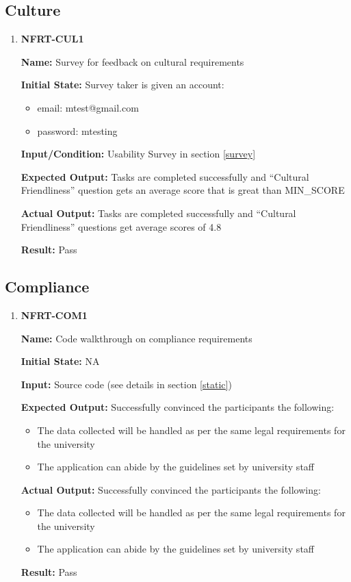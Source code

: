 \documentclass[12pt, titlepage]{article}
\begin{document}
\subsection{Culture}
\begin{enumerate}
\item \textbf{NFRT-CUL1}

\textbf{Name:} Survey for feedback on cultural requirements

\textbf{Initial State:} Survey taker is given an account:
\begin{itemize}
\item email: mtest@gmail.com
\item password: mtesting
\end{itemize}

\textbf{Input/Condition:} Usability Survey in section \ref{survey}

\textbf{Expected Output:} Tasks are completed successfully and ``Cultural Friendliness'' question gets an average score that is great than MIN\_SCORE

\textbf{Actual Output:} Tasks are completed successfully and ``Cultural Friendliness'' questions get average scores of 4.8

\textbf{Result:} Pass
\end{enumerate}
\subsection{Compliance}
\begin{enumerate}
\item \textbf{NFRT-COM1}

\textbf{Name:} Code walkthrough on compliance requirements

\textbf{Initial State:} NA

\textbf{Input:} Source code (see details in section \ref{static})

\textbf{Expected Output:} Successfully convinced the participants the following:
\begin{itemize}
\item The data collected will be handled as per the same legal requirements for the university
\item The application can abide by the guidelines set by university staff
\end{itemize}

\textbf{Actual Output:} Successfully convinced the participants the following:
\begin{itemize}
\item The data collected will be handled as per the same legal requirements for the university
\item The application can abide by the guidelines set by university staff
\end{itemize}

\textbf{Result:} Pass
\end{enumerate}
\end{document}
